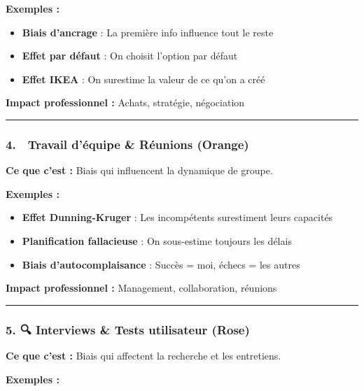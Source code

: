 \documentclass[
]{article}
\providecommand{\tightlist}{%
  \setlength{\itemsep}{0pt}\setlength{\parskip}{0pt}}
\begin{document}
\textbf{Exemples :}

\begin{itemize}
\tightlist
\item
  \textbf{Biais d'ancrage} : La première info influence tout le reste
\item
  \textbf{Effet par défaut} : On choisit l'option par défaut
\item
  \textbf{Effet IKEA} : On surestime la valeur de ce qu'on a créé
\end{itemize}

\textbf{Impact professionnel :} Achats, stratégie, négociation

\begin{center}\rule{0.5\linewidth}{0.5pt}\end{center}

\subsubsection{4. 👥 Travail d'équipe \& Réunions
(Orange)}\label{travail-duxe9quipe-ruxe9unions-orange}

\textbf{Ce que c'est :} Biais qui influencent la dynamique de groupe.

\textbf{Exemples :}

\begin{itemize}
\tightlist
\item
  \textbf{Effet Dunning-Kruger} : Les incompétents surestiment leurs
  capacités
\item
  \textbf{Planification fallacieuse} : On sous-estime toujours les
  délais
\item
  \textbf{Biais d'autocomplaisance} : Succès = moi, échecs = les autres
\end{itemize}

\textbf{Impact professionnel :} Management, collaboration, réunions

\begin{center}\rule{0.5\linewidth}{0.5pt}\end{center}

\subsubsection{5. 🔍 Interviews \& Tests utilisateur
(Rose)}\label{interviews-tests-utilisateur-rose}

\textbf{Ce que c'est :} Biais qui affectent la recherche et les
entretiens.

\textbf{Exemples :}
\end{document}
